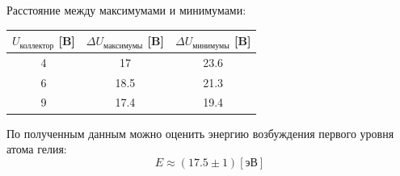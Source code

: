 \documentclass[a4paper,12pt]{article} %
\begin{document}
	\newpage
			Расстояние между максимумами и минимумами:
			\begin{table}[h!]
				\centering
				\begin{tabular}{|c|c|c|}
				\hline
				$U_\text{коллектор}$ [B] & $\Delta U_\text{максимумы}$ [B]  & $\Delta U_\text{минимумы}$ [B]\\ \hline
				4                        & 17                           	& 23.6                      	\\ \hline
				6                        & 18.5                         	& 21.3                      	\\ \hline
				9                        & 17.4                         	& 19.4                      	\\ \hline
				\end{tabular}
			\end{table}\par
			По полученным данным можно оценить энергию возбуждения первого уровня атома гелия:
			\begin{equation}
				E \approx (17.5 \pm 1) [\text{эВ}] 
			\end{equation}
			
\end{document}
